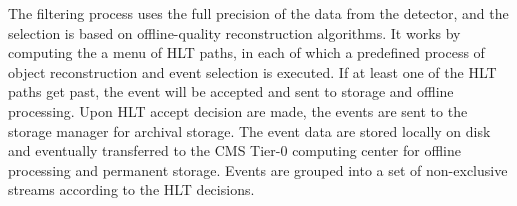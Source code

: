 The filtering process uses the full precision of the data from the detector, and the selection is based on offline-quality reconstruction algorithms. It works by computing the a menu of HLT paths, in each of which a predefined process of object reconstruction and event selection is executed. If at least one of the HLT paths get past, the event will be accepted and sent to storage and offline processing. Upon HLT accept decision are made, the events are sent to the storage manager for archival storage. The event data are stored locally on disk and eventually transferred to the CMS Tier-0 computing center for offline processing and permanent storage. Events are grouped into a set of non-exclusive streams according to the HLT decisions.



